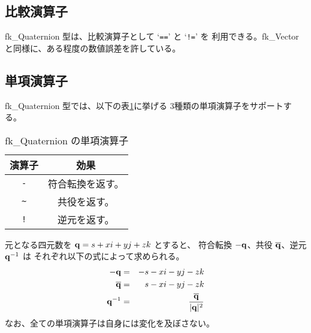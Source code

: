 \subsection{比較演算子}
fk\_Quaternion 型は、比較演算子として `\verb+==+' と `\verb+!=+' を
利用できる。fk\_Vector と同様に、ある程度の数値誤差を許している。

\subsection{単項演算子}
fk\_Quaternion 型では、以下の表\ref{tbl:fkQ1}に挙げる
3種類の単項演算子をサポートする。
\begin{table}[H]
\caption{fk\_Quaternion の単項演算子}
\label{tbl:fkQ1}
\begin{center}
\begin{tabular}{|c|c|}
\hline
演算子 & 効果 \\ \hline \hline
\verb+-+ & 符合転換を返す。 \\ \hline
\verb+~+ & 共役を返す。\\ \hline
\verb+!+ & 逆元を返す。\\ \hline
\end{tabular}
\end{center}
\end{table}
元となる四元数を \(\mathbf{q} = s + xi + yj + zk\) とすると、
符合転換 \(-\mathbf{q}\)、共役 \(\overline{\mathbf{q}}\)、逆元 \(\mathbf{q}^{-1}\) は
それぞれ以下の式によって求められる。
\begin{eqnarray*}
	-\mathbf{q} &=& -s - xi - yj - zk \\
	\overline{\mathbf{q}} &=& s - xi - yj - zk \\
	\mathbf{q}^{-1} &=& {\displaystyle \frac{\overline{\mathbf{q}}}{|\mathbf{q}|^2}}
\end{eqnarray*}
なお、全ての単項演算子は自身には変化を及ぼさない。
